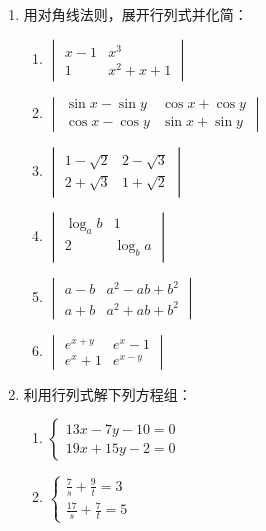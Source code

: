 \begin{enumerate}
  \item 用对角线法则，展开行列式并化简：
\begin{multicols}{2}
\begin{enumerate}[(1)]
  \item $\begin{vmatrix}
    x-1& x^3\\ 1& x^2+x+1
  \end{vmatrix}$
  \item $\begin{vmatrix}
    \sin x-\sin y& \cos x+\cos y\\
    \cos x-\cos y& \sin x+\sin y
  \end{vmatrix}$
  \item $\begin{vmatrix}
    1-\sqrt{2} &2-\sqrt{3}\\
    2+\sqrt{3} & 1+\sqrt{2}
  \end{vmatrix}$
  \item $\begin{vmatrix}
    \log_a b& 1\\2&\log_b a
  \end{vmatrix}$
  \item $\begin{vmatrix}
    a-b&a^2-ab+b^2\\ a+b& a^2+ab+b^2
  \end{vmatrix}$
  \item $\begin{vmatrix}
    e^{x+y} &e^x-1\\
    e^x+1 & e^{x-y}
  \end{vmatrix}$
\end{enumerate}
\end{multicols}
  \item 利用行列式解下列方程组：
\begin{multicols}{2}
\begin{enumerate}[(1)]
  \item $\begin{cases}
    13x-7y-10=0\\
    19x+15y-2=0
  \end{cases}$
  \item $\begin{cases}
    \frac{7}{s}+\frac{9}{t}=3\\[1ex]
    \frac{17}{s}+\frac{7}{t}=5
  \end{cases}$
\end{enumerate}
\end{multicols}

\end{enumerate}
